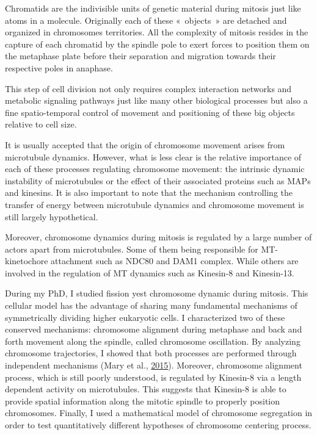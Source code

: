 \documentclass[12pt,a4paper,twoside,openright]{book}
\begin{document}
Chromatids are the indivisible units of genetic material during mitosis
just like atoms in a molecule. Originally each of these «~objects~» are
detached and organized in chromosomes territories. All the complexity of
mitosis resides in the capture of each chromatid by the spindle pole to
exert forces to position them on the metaphase plate before their
separation and migration towards their respective poles in anaphase.

This step of cell division not only requires complex interaction
networks and metabolic signaling pathways just like many other
biological processes but also a fine spatio-temporal control of movement
and positioning of these big objects relative to cell size.

It is usually accepted that the origin of chromosome movement arises
from microtubule dynamics. However, what is less clear is the relative
importance of each of these processes regulating chromosome movement:
the intrinsic dynamic instability of microtubules or the effect of their
associated proteins such as MAPs and kinesins. It is also important to
note that the mechanism controlling the transfer of energy between
microtubule dynamics and chromosome movement is still largely
hypothetical.

Moreover, chromosome dynamics during mitosis is regulated by a large
number of actors apart from microtubules. Some of them being responsible
for MT-kinetochore attachment such as NDC80 and DAM1 complex. While
others are involved in the regulation of MT dynamics such as Kinesin-8
and Kinesin-13.

During my PhD, I studied fission yest chromosome dynamic during mitosis.
This cellular model has the advantage of sharing many fundamental
mechanisms of symmetrically dividing higher eukaryotic cells. I
characterized two of these conserved mechanisms: chromosome alignment
during metaphase and back and forth movement along the spindle, called
chromosome oscillation. By analyzing chromosome trajectories, I showed
that both processes are performed through independent mechanisms (Mary
et al., \protect\hyperlink{ref-Mary2015}{2015}). Moreover, chromosome
alignment process, which is still poorly understood, is regulated by
Kinesin-8 via a length dependent activity on microtubules. This suggests
that Kinesin-8 is able to provide spatial information along the mitotic
spindle to properly position chromosomes. Finally, I used a mathematical
model of chromosome segregation in order to test quantitatively
different hypotheses of chromosome centering process.
\end{document}
